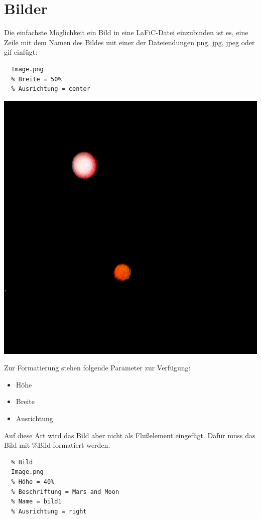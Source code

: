 \documentclass{scrartcl}
\begin{document}
\section{Bilder}

{Die einfachste Möglichkeit ein Bild in eine LaFiC-Datei
einzubinden ist es, eine Zeile mit dem Namen des Bildes mit
einer der Dateiendungen png, jpg, jpeg oder gif einfügt:\\}

\begin{verbatim}
  Image.png
  % Breite = 50%
  % Ausrichtung = center
\end{verbatim}


{\centering\includegraphics[width=.50\linewidth]{Image.png}\\}

{Zur Formatierung stehen folgende Parameter zur Verfügung:\\}

\begin{itemize}
\item Höhe
\item Breite
\item Ausrichtung
\end{itemize}


{Auf diese Art wird das Bild aber nicht als Flußelement
eingefügt. Dafür muss das Bild mit  \%Bild formatiert
werden.\\}

\begin{verbatim}
  % Bild
  Image.png
  % Höhe = 40%
  % Beschriftung = Mars and Moon
  % Name = bild1
  % Ausrichtung = right
\end{verbatim}
\end{document}
